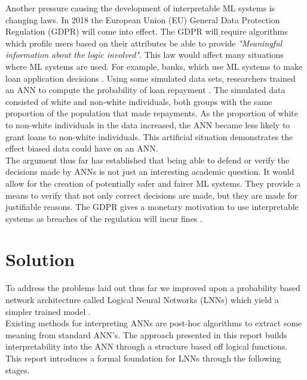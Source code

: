 Another pressure causing the development of interpretable ML systems is changing laws. In 2018 the European Union (EU) General Data Protection Regulation \cite{eu-dgpr} (GDPR) will come into effect. The GDPR will require algorithms which profile users based on their attributes be able to provide \textit{"Meaningful information about the logic involved"}. This law would affect many situations where ML systems are used. For example, banks, which use ML systems to make loan application decisions \cite{goodman2016european}. Using some simulated data sets, researchers trained an ANN to compute the probability of loan repayment \cite{goodman2016european}. The simulated data consisted of white and non-white individuals, both groups with the same proportion of the population that made repayments. As the proportion of white to non-white individuals in the data increased, the ANN became less likely to grant loans to non-white individuals. This artificial situation demonstrates the effect biased data could have on an ANN.\\

The argument thus far has established that being able to defend or verify the decisions made by ANNs is not just an interesting academic question. It would allow for the creation of potentially safer and fairer ML systems. They provide a means to verify that not only correct decisions are made, but they are made for justifiable reasons. The GDPR gives a monetary motivation to use interpretable systems as breaches of the regulation will incur fines \cite{goodman2016european}.\\

\section{Solution}
To address the problems laid out thus far we improved upon a probability based network architecture called Logical Neural Networks (LNNs) which yield a simpler trained model \cite{LearningLogicalActivations}.\\

Existing methods for interpreting ANNs are post-hoc algorithms to extract some meaning from standard ANN's. The approach presented in this report builds interpretability into the ANN through a structure based off logical functions. This report introduces a formal foundation for LNNs through the following stages.

